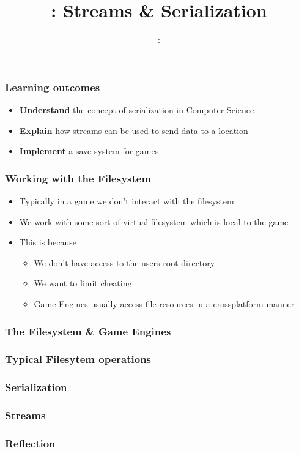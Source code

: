 \usepackage{../../beamerthemeFalmouthGamesAcademy}
\usepackage{multimedia}
\graphicspath{ {../../} }


\usepackage[normalem]{ulem}
\usepackage{wasysym}
\usepackage{listings}
\usepackage{pdfpages}

\usetikzlibrary{arrows,automata}




\title{\sessionnumber: Streams \& Serialization}
\subtitle{\modulecode: \moduletitle}

\frame{\titlepage}

\begin{frame}
	\frametitle{Learning outcomes}
	\begin{itemize}
		\item \textbf{Understand} the concept of serialization in Computer Science
		\item \textbf{Explain} how streams can be used to send data to a location
		\item \textbf{Implement} a save system for games
	\end{itemize}
\end{frame}

\begin{frame}
	\frametitle{Working with the Filesystem}
	\begin{itemize}
		\item Typically in a game we don't interact with the filesystem
		\item We work with some sort of virtual filesystem which is local to the game
		\item This is because
		\begin{itemize}
				\item We don't have access to the users root directory
				\item We want to limit cheating
				\item Game Engines usually access file resources in a crossplatform manner
		\end{itemize}
	\end{itemize}
\end{frame}

\begin{frame}
	\frametitle{The Filesystem \& Game Engines}
\end{frame}

\begin{frame}
	\frametitle{Typical Filesytem operations}
\end{frame}

\begin{frame}
	\frametitle{Serialization}
\end{frame}

\begin{frame}
	\frametitle{Streams}
\end{frame}

\begin{frame}
	\frametitle{Reflection}
\end{frame}


